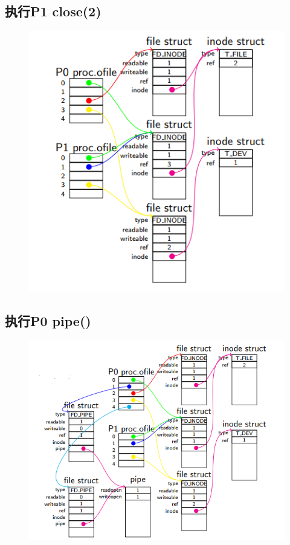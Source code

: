 \documentclass[a4paper,12pt]{report}
\begin{document}
\subsection{ 	执行P1 close(2)}
\begin{figure}[H]
	\centering
	\includegraphics [width=1.0\textwidth]{figure//image165.png}
\end{figure}
\subsection{ 	执行P0 pipe()}
\begin{figure}[H]
	\centering
	\includegraphics [width=1.0\textwidth]{figure//image166.png}
\end{figure}
\end{document}
